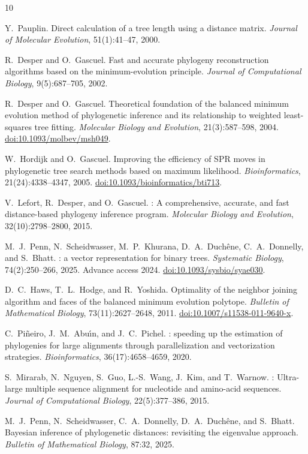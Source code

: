 \begin{thebibliography}{10}

Y.~Pauplin.
\newblock Direct calculation of a tree length using a distance matrix.
\newblock \emph{Journal of Molecular Evolution}, 51(1):41--47, 2000.

R.~Desper and O.~Gascuel.
\newblock Fast and accurate phylogeny reconstruction algorithms based on the minimum-evolution principle.
\newblock \emph{Journal of Computational Biology}, 9(5):687--705, 2002.

R.~Desper and O.~Gascuel.
\newblock Theoretical foundation of the balanced minimum evolution method of phylogenetic inference and its relationship to weighted least-squares tree fitting.
\newblock \emph{Molecular Biology and Evolution}, 21(3):587--598, 2004.
\newblock \href{https://doi.org/10.1093/molbev/msh049}{doi:10.1093/molbev/msh049}.

W.~Hordijk and O.~Gascuel.
\newblock Improving the efficiency of {SPR} moves in phylogenetic tree search methods based on maximum likelihood.
\newblock \emph{Bioinformatics}, 21(24):4338--4347, 2005.
\newblock \href{https://doi.org/10.1093/bioinformatics/bti713}{doi:10.1093/bioinformatics/bti713}.

V.~Lefort, R.~Desper, and O.~Gascuel.
: A comprehensive, accurate, and fast distance-based phylogeny inference program.
\newblock \emph{Molecular Biology and Evolution}, 32(10):2798--2800, 2015.

M.~J.~Penn, N.~Scheidwasser, M.~P.~Khurana, D.~A.~Duch\^ene, C.~A.~Donnelly, and S.~Bhatt.
: a vector representation for binary trees.
\newblock \emph{Systematic Biology}, 74(2):250--266, 2025. Advance access 2024.
\newblock \href{https://doi.org/10.1093/sysbio/syae030}{doi:10.1093/sysbio/syae030}.

D.~C.~Haws, T.~L.~Hodge, and R.~Yoshida.
\newblock Optimality of the neighbor joining algorithm and faces of the balanced minimum evolution polytope.
\newblock \emph{Bulletin of Mathematical Biology}, 73(11):2627--2648, 2011.
\newblock \href{https://doi.org/10.1007/s11538-011-9640-x}{doi:10.1007/s11538-011-9640-x}.

C.~Pi\~neiro, J.~M.~Abu\'\i n, and J.~C.~Pichel.
: speeding up the estimation of phylogenies for large alignments through parallelization and vectorization strategies.
\newblock \emph{Bioinformatics}, 36(17):4658--4659, 2020.

S.~Mirarab, N.~Nguyen, S.~Guo, L.-S.~Wang, J.~Kim, and T.~Warnow.
: Ultra-large multiple sequence alignment for nucleotide and amino-acid sequences.
\newblock \emph{Journal of Computational Biology}, 22(5):377--386, 2015.

M.~J.~Penn, N.~Scheidwasser, C.~A.~Donnelly, D.~A.~Duch\^ene, and S.~Bhatt.
\newblock Bayesian inference of phylogenetic distances: revisiting the eigenvalue approach.
\newblock \emph{Bulletin of Mathematical Biology}, 87:32, 2025.
\end{thebibliography}
